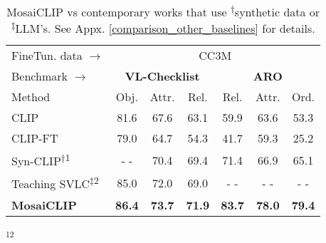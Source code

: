 \documentclass[11pt]{article}
\newcommand{\methodcomp}{MosaiCLIP}
\newcommand{\methodcompbold}{\textbf{MosaiCLIP}}
\newcommand{\clip}{CLIP}
\begin{document}
\begin{table}[h]
\fontsize{9.4}{8pt}\selectfont
  \centering
  \setlength{\tabcolsep}{3.5pt}
  \begin{tabular}{lccc|ccc}
    \toprule
    FineTun. data $\rightarrow$ & \multicolumn{6}{c}{CC3M} \\
    \cmidrule(lr){2-7}
    Benchmark $\rightarrow$ & \multicolumn{3}{c|}{\textbf{VL-Checklist}} & \multicolumn{3}{c}{\textbf{ARO}} \\
    \cmidrule(lr){2-4} \cmidrule(lr){5-7}
    \multirow{1}{*}{Method} & Obj. & Attr. & Rel. & Rel. & Attr. & Ord. \\
    \midrule
    \clip{} & 81.6	& 67.6	& 63.1 & 59.9 & 63.6 & 53.3 \\[1pt]
    \clip{}-FT & 79.0 & 64.7 & 54.3 & 41.7 & 59.3 & 25.2 \\[1pt]
    Syn-CLIP\textsuperscript{$\dagger$}\textsuperscript{1} & - - & 70.4 & 69.4 & 71.4 & 66.9 & 65.1\\[1pt]
    Teaching SVLC\textsuperscript{$\ddagger$}\textsuperscript{2} & 85.0 & 72.0 & 69.0 & - - & - - & - -\\[1pt]
    \midrule
    \rowcolor{cyan!12}
    \methodcompbold{} & \textbf{86.4} & \textbf{73.7} & \textbf{71.9} & \textbf{83.7} & \textbf{78.0} & \textbf{79.4} \\
    \bottomrule
  \end{tabular}
  \textsuperscript{1}\citep{cascantebonilla2023going}\textsuperscript{2}\citep{doveh2023teaching}
  
  \caption{\methodcomp{} vs contemporary works that use \textsuperscript{$\dagger$}synthetic data or \textsuperscript{$\ddagger$}LLM's. See Appx. \ref{comparison_other_baselines} for details.}
  \label{tab:comparison_other_baselines_main}
  \vspace{-0.5cm}
  
\end{table}
  
\end{document}

